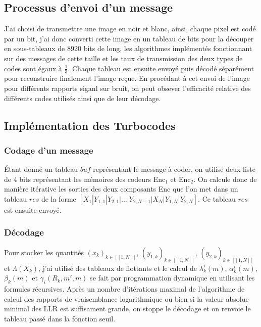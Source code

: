 \documentclass[12pt]{article}
\begin{document}
\subsection{Processus d'envoi d'un message}
J'ai choisi de transmettre une image en noir et blanc, ainsi, chaque pixel est cod\'e par un bit, j'ai donc converti cette image en un tableau de bits pour la d\'ecouper en sous-tableaux de 8920 bits de long, les algorithmes impl\'ement\'es fonctionnant sur des messages de cette taille et les taux de transmission des deux types de codes sont \'egaux \`a $\frac{1}{3}$. Chaque tableau est ensuite envoy\'e puis d\'ecod\'e s\'epar\'ement pour reconstruire finalement l'image re\c{c}ue. En proc\'edant \`a cet envoi de l'image pour diff\'erents rapports  siganl sur bruit, on peut obsever l'efficacit\'e relative des diff\'erents codes utilis\'es ainsi que de leur d\'ecodage.


\subsection{Impl\'ementation des Turbocodes}
\subsubsection{Codage d'un message}
\'Etant donn\'e un tableau $buf$ repr\'esentant le message \`a coder, on utilise deux liste de 4 bits repr\'esentant les m\'emoires des codeurs Enc$_1$ et Enc$_2$. On calcule donc de mani\`ere it\'erative les sorties des deux composants Enc que l'on met dans un tableau $res$ de la forme $[X_1| Y_{1,1}| Y_{2,1}|\ldots| Y_{2,N-1}| X_N| Y_{1,N}| Y_{2,N}]$. Ce tableau $res$ est ensuite envoy\'e.


\subsubsection{D\'ecodage }
Pour stocker les quantit\'es $(x_k)_{k \in [\![1, N]\!]}$, $(y_{1,k})_{k \in [\![1, N]\!]}$, $(y_{2,k})_{k \in [\![1, N]\!]}$ et $\Lambda(X_k)$, j'ai utilis\'e des tableaux de flottants et le calcul de $\lambda_k^i(m)$, $\alpha_k^i(m)$, $\beta_k(m)$ et $\gamma_i(R_k, m', m)$ se fait par programmation dynamique en utilisant les formules r\'ecursives. Apr\`es un nombre d'it\'erations maximal de l'algorithme de calcul des rapports de vraisemblance logarithmique ou bien si la valeur absolue minimal des LLR est suffisament grande, on stoppe le d\'ecodage et on renvoie le tableau pass\'e dans la fonction seuil.
\end{document}
